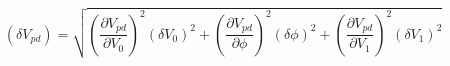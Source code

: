 \begin{equation}
\label{eq:deltaV}
\left(\delta V_{pd}\right) = \sqrt{\left( \frac{\partial{V_{pd}}}{\partial{V_0}}\right)^2 (\delta V_0)^2 + \left( \frac{\partial{V_{pd}}}{\partial{\phi}}\right)^2 (\delta \phi)^2 + \left( \frac{\partial{V_{pd}}}{\partial{V_1}}\right)^2 (\delta V_1)^2}
\end{equation}